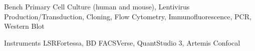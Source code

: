

\begin{cvskills}

  \cvskill
    {Bench} %
    {Primary Cell Culture (human and mouse), Lentivirus Production/Transduction, Cloning, Flow Cytometry, Immunofluorescence, PCR, Western Blot} %

  \cvskill
    {Instruments} %
    {LSRFortessa, BD FACSVerse, QuantStudio 3, Artemis Confocal} %

 
\end{cvskills}
